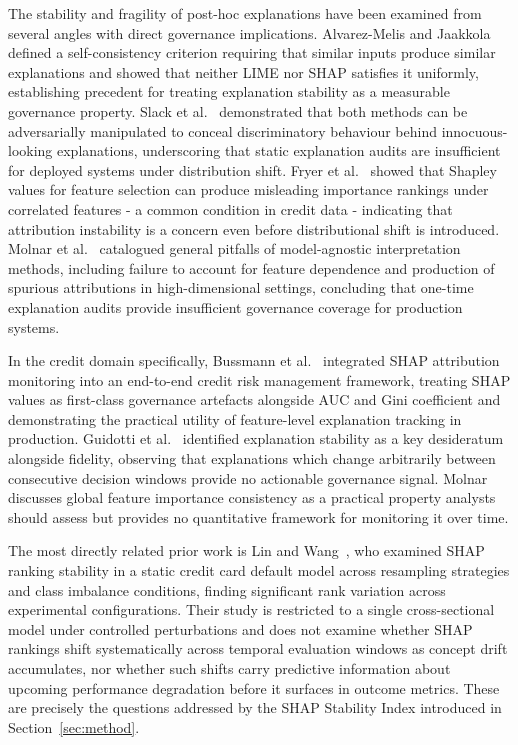 \documentclass[pdflatex,sn-mathphys-num]{sn-jnl}
\theoremstyle{thmstyleone}
\theoremstyle{thmstyletwo}
\theoremstyle{thmstylethree}
\begin{document}
The stability and fragility of post-hoc explanations have been examined from
several angles with direct governance implications. Alvarez-Melis and
Jaakkola~\cite{alvarez2018robustness} defined a self-consistency criterion
requiring that similar inputs produce similar explanations and showed that neither
LIME nor SHAP satisfies it uniformly, establishing precedent for treating
explanation stability as a measurable governance property. Slack et
al.~\cite{slack2020fooling} demonstrated that both methods can be adversarially
manipulated to conceal discriminatory behaviour behind innocuous-looking
explanations, underscoring that static explanation audits are insufficient for
deployed systems under distribution shift. Fryer et al.~\cite{fryer2021shapley}
showed that Shapley values for feature selection can produce misleading importance
rankings under correlated features - a common condition in credit data -
indicating that attribution instability is a concern even before distributional
shift is introduced. Molnar et al.~\cite{molnar2022pitfalls} catalogued general
pitfalls of model-agnostic interpretation methods, including failure to account
for feature dependence and production of spurious attributions in high-dimensional
settings, concluding that one-time explanation audits provide insufficient
governance coverage for production systems.

In the credit domain specifically, Bussmann et al.~\cite{bussmann2021credit}
integrated SHAP attribution monitoring into an end-to-end credit risk management
framework, treating SHAP values as first-class governance artefacts alongside
AUC and Gini coefficient and demonstrating the practical utility of feature-level
explanation tracking in production. Guidotti et al.~\cite{guidotti2018survey}
identified explanation stability as a key desideratum alongside fidelity,
observing that explanations which change arbitrarily between consecutive decision
windows provide no actionable governance signal. Molnar~\cite{molnar2022iml}
discusses global feature importance consistency as a practical property analysts
should assess but provides no quantitative framework for monitoring it over time.

The most directly related prior work is Lin and Wang~\cite{lin2025shap}, who
examined SHAP ranking stability in a static credit card default model across
resampling strategies and class imbalance conditions, finding significant rank
variation across experimental configurations. Their study is restricted to a
single cross-sectional model under controlled perturbations and does not examine
whether SHAP rankings shift systematically across temporal evaluation windows as
concept drift accumulates, nor whether such shifts carry predictive information
about upcoming performance degradation before it surfaces in outcome metrics.
These are precisely the questions addressed by the SHAP Stability Index
introduced in Section~\ref{sec:method}.
\end{document}
